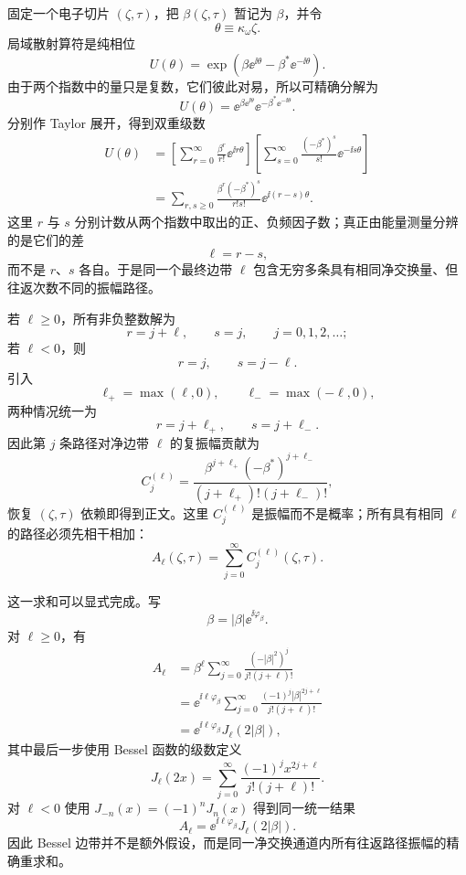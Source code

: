 \begin{derivation}[有限脉冲散射的侧带振幅]
固定一个电子切片 $(\zeta,\tau)$，把 $\beta(\zeta,\tau)$ 暂记为 $\beta$，并令
\[
 \theta\equiv\kappa_\omega\zeta.
\]
局域散射算符是纯相位
\begin{equation*}
 U(\theta)=\exp\!\left(\beta \ee^{\ii\theta}-\beta^*\ee^{-\ii\theta}\right).
\end{equation*}
由于两个指数中的量只是复数，它们彼此对易，所以可精确分解为
\begin{equation*}
 U(\theta)
 =\ee^{\beta \ee^{\ii\theta}}
  \ee^{-\beta^*\ee^{-\ii\theta}}.
\end{equation*}
分别作 Taylor 展开，得到双重级数
\begin{align*}
 U(\theta)
 &=\left[\sum_{r=0}^{\infty}
 \frac{\beta^r}{r!}\ee^{\ii r\theta}\right]
 \left[\sum_{s=0}^{\infty}
 \frac{(-\beta^*)^s}{s!}\ee^{-\ii s\theta}\right]\\
 &=\sum_{r,s\ge0}
 \frac{\beta^r(-\beta^*)^s}{r!s!}
 \ee^{\ii(r-s)\theta}.
\end{align*}
这里 $r$ 与 $s$ 分别计数从两个指数中取出的正、负频因子数；真正由能量测量分辨的是它们的差
\[
 \ell=r-s,
\]
而不是 $r$、$s$ 各自。于是同一个最终边带 $\ell$ 包含无穷多条具有相同净交换量、但往返次数不同的振幅路径。

若 $\ell\ge0$，所有非负整数解为
\[
 r=j+\ell,\qquad s=j,
 \qquad j=0,1,2,\ldots;
\]
若 $\ell<0$，则
\[
 r=j,\qquad s=j-\ell.
\]
引入
\[
 \ell_+=\max(\ell,0),
 \qquad
 \ell_-=\max(-\ell,0),
\]
两种情况统一为
\[
 r=j+\ell_+,
 \qquad
 s=j+\ell_-.
\]
因此第 $j$ 条路径对净边带 $\ell$ 的复振幅贡献为
\begin{equation*}
 C_j^{(\ell)}
 =\frac{\beta^{j+\ell_+}(-\beta^*)^{j+\ell_-}}
 {(j+\ell_+)!(j+\ell_-)!},
\end{equation*}
恢复 $(\zeta,\tau)$ 依赖即得到正文。这里 $C_j^{(\ell)}$ 是振幅而不是概率；所有具有相同 $\ell$ 的路径必须先相干相加：
\begin{equation*}
 A_\ell(\zeta,\tau)
 =\sum_{j=0}^{\infty}C_j^{(\ell)}(\zeta,\tau).
\end{equation*}

这一求和可以显式完成。写
\[
 \beta=|\beta|\ee^{\ii\varphi_\beta}.
\]
对 $\ell\ge0$，有
\begin{align*}
 A_\ell
 &=\beta^\ell
 \sum_{j=0}^{\infty}
 \frac{(-|\beta|^2)^j}{j!(j+\ell)!}\\
 &=\ee^{\ii\ell\varphi_\beta}
 \sum_{j=0}^{\infty}
 \frac{(-1)^j|\beta|^{2j+\ell}}{j!(j+\ell)!}\\
 &=\ee^{\ii\ell\varphi_\beta}J_\ell(2|\beta|),
\end{align*}
其中最后一步使用 Bessel 函数的级数定义
\[
 J_\ell(2x)
 =\sum_{j=0}^{\infty}
 \frac{(-1)^j x^{2j+\ell}}{j!(j+\ell)!}.
\]
对 $\ell<0$ 使用 $J_{-n}(x)=(-1)^nJ_n(x)$ 得到同一统一结果
\begin{equation*}
 {
 A_\ell=\ee^{\ii\ell\varphi_\beta}J_\ell(2|\beta|).}
\end{equation*}
因此 Bessel 边带并不是额外假设，而是同一净交换通道内所有往返路径振幅的精确重求和。


\end{derivation}
